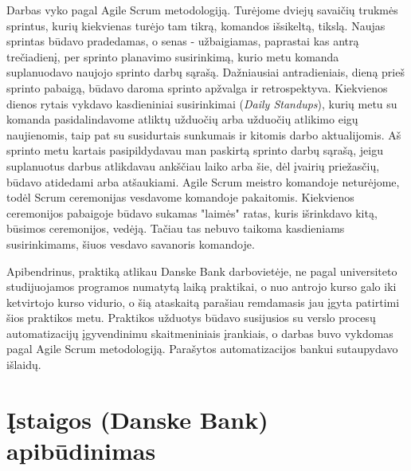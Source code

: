\documentclass{VUMIFPSBakPrakAt}
\begin{document}
\par
Darbas vyko pagal Agile Scrum metodologiją. Turėjome dviejų savaičių trukmės sprintus, kurių kiekvienas turėjo tam tikrą, komandos išsikeltą, tikslą. Naujas sprintas būdavo pradedamas, o senas - užbaigiamas, paprastai kas antrą trečiadienį, per sprinto planavimo susirinkimą, kurio metu komanda suplanuodavo naujojo sprinto darbų sąrašą. Dažniausiai antradieniais, dieną prieš sprinto pabaigą, būdavo daroma sprinto apžvalga ir retrospektyva. Kiekvienos dienos rytais vykdavo kasdieniniai susirinkimai (\textit{Daily Standups}), kurių metu su komanda pasidalindavome atliktų užduočių arba užduočių atlikimo eigų naujienomis, taip pat su susidurtais sunkumais ir kitomis darbo aktualijomis. Aš sprinto metu kartais pasipildydavau man paskirtą sprinto darbų sąrašą, jeigu suplanuotus darbus atlikdavau ankščiau laiko arba šie, dėl įvairių priežasčių, būdavo atidedami arba atšaukiami. Agile Scrum meistro komandoje neturėjome, todėl Scrum ceremonijas vesdavome komandoje pakaitomis. Kiekvienos ceremonijos pabaigoje būdavo sukamas "laimės" ratas, kuris išrinkdavo kitą, būsimos ceremonijos, vedėją. Tačiau tas nebuvo taikoma kasdieniams susirinkimams, šiuos vesdavo savanoris komandoje.
\par
Apibendrinus, praktiką atlikau Danske Bank darbovietėje, ne pagal universiteto studijuojamos programos numatytą laiką praktikai, o nuo antrojo kurso galo iki ketvirtojo kurso vidurio, o šią ataskaitą parašiau remdamasis jau įgyta patirtimi šios praktikos metu. Praktikos užduotys būdavo susijusios su verslo procesų automatizacijų įgyvendinimu skaitmeniniais įrankiais, o darbas buvo vykdomas pagal Agile Scrum metodologiją. Parašytos automatizacijos bankui sutaupydavo išlaidų.

\section{Įstaigos (Danske Bank) apibūdinimas}

\begin{comment}
Įmonės/įstaigos apibūdinimas. Glaustai aprašoma įmonė/įstaiga, kurioje buvo atlikta praktika: jos
veiklos sritis, organizacinė struktūra, teikiamos paslaugos ir kt. Apibūdinamos praktikos vietoje
sudarytos darbo sąlygos (1--2 psl.).

Skyriai gali turėti poskyrius ir smulkesnes sudėtines dalis, kaip punktus ir
papunkčius.
\end{comment}
\end{document}

